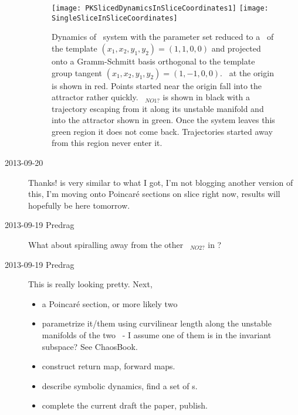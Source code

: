 \begin{description}
\begin{figure}%
  \begin{center}
  \texttt{[image: PKSlicedDynamicsInSliceCoordinates1]}
  \texttt{[image: SingleSliceInSliceCoordinates]}
  \end{center}
  \caption{
    Dynamics of \twomode\ system with the parameter set
     reduced to a \slicePlane\ of the template
 	$(x_1, x_2, y_1, y_2) =  (1, 1, 0, 0)$ and projected onto a Gramm-Schmitt
 	basis orthogonal to the template group tangent $(x_1, x_2, y_1, y_2) =
 	(1, -1, 0, 0)$. \Reqv\ at the origin is shown in red. Points started near
 	the origin fall into the attractor rather quickly. \Reqv\ ${}_{NO1?}$ is
 	shown in black with a trajectory escaping from it along its unstable manifold
 	and into the attractor shown in green. Once the system leaves this green region
 	it does not come back. Trajectories started away from this region never enter it.
 }
  \label{fig:DBSingleSliceReducedDynamics}
\end{figure}

\item[2013-09-20] Thanks!  is very similar to what I got, I'm not
blogging another version of this, I'm moving onto Poincar\'e sections on slice right now, results will hopefully
be here tomorrow.

\item[2013-09-19 Predrag] What about spiralling away from the other \reqv\ ${}_{NO2?}$
in ?

\item[2013-09-19 Predrag] This is really looking pretty. Next,
\begin{itemize}
  \item a Poincar\'e section, or more likely two
  \item parametrize it/them using curvilinear length along the
  unstable manifolds of the two \reqva\ - I assume one of them is in
  the invariant subspace?
   {See ChaosBook}.
  \item construct return map, forward maps.
  \item describe symbolic dynamics, find a set of \rpo s.
  \item complete the current draft the paper, publish.
\end{itemize}


\end{description}
